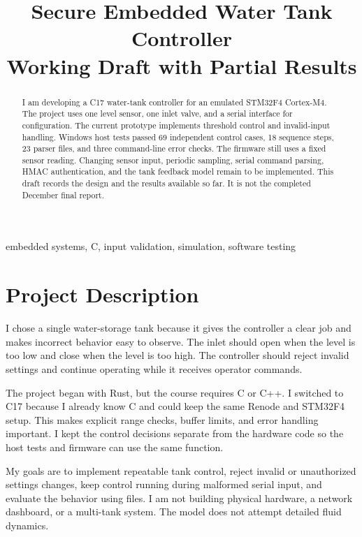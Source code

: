 \documentclass[conference]{IEEEtran}
\begin{document}
\title{Secure Embedded Water Tank Controller\\{\large Working Draft with Partial Results}}
\author{}
\maketitle
\begin{abstract}
I am developing a C17 water-tank controller for an emulated STM32F4 Cortex-M4. The project uses one level sensor, one inlet valve, and a serial interface for configuration. The current prototype implements threshold control and invalid-input handling. Windows host tests passed 69 independent control cases, 18 sequence steps, 23 parser files, and three command-line error checks. The firmware still uses a fixed sensor reading. Changing sensor input, periodic sampling, serial command parsing, HMAC authentication, and the tank feedback model remain to be implemented. This draft records the design and the results available so far. It is not the completed December final report.
\end{abstract}
\begin{IEEEkeywords}
embedded systems, C, input validation, simulation, software testing
\end{IEEEkeywords}

\section{Project Description}
I chose a single water-storage tank because it gives the controller a clear job and makes incorrect behavior easy to observe. The inlet should open when the level is too low and close when the level is too high. The controller should reject invalid settings and continue operating while it receives operator commands.

The project began with Rust, but the course requires C or C++. I switched to C17 because I already know C and could keep the same Renode and STM32F4 setup. This makes explicit range checks, buffer limits, and error handling important. I kept the control decisions separate from the hardware code so the host tests and firmware can use the same function.

My goals are to implement repeatable tank control, reject invalid or unauthorized settings changes, keep control running during malformed serial input, and evaluate the behavior using files. I am not building physical hardware, a network dashboard, or a multi-tank system. The model does not attempt detailed fluid dynamics.
\end{document}
